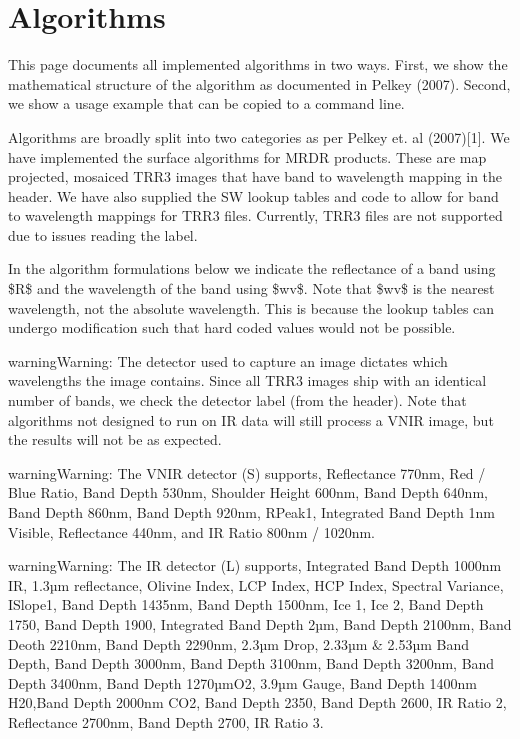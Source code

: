 \documentclass[letterpaper,10pt,english]{sphinxmanual}
\begin{document}
\section{Algorithms}
\label{Algorithms:algorithms}\label{Algorithms::doc}\label{Algorithms:id1}
This page documents all implemented algorithms in two ways.  First, we show the mathematical structure of the algorithm as documented in Pelkey (2007).  Second, we show a usage example that can be copied to a command line.

Algorithms are broadly split into two categories as per Pelkey et. al (2007){[}1{]}.  We have implemented the surface algorithms for MRDR products.  These are map projected, mosaiced TRR3 images that have band to wavelength mapping in the header.  We have also supplied the SW lookup tables and code to allow for band to wavelength mappings for TRR3 files.  Currently, TRR3 files are not supported due to issues reading the label.

In the algorithm formulations below we indicate the reflectance of a band using \$R\$ and the wavelength of the band using \$wv\$.  Note that \$wv\$ is the nearest wavelength, not the absolute wavelength.  This is because the lookup tables can undergo modification such that hard coded values would not be possible.

\begin{notice}{warning}{Warning:}
The detector used to capture an image dictates which wavelengths the image contains.  Since all TRR3 images ship with an identical number of bands, we check the detector label (from the header).  Note that algorithms not designed to run on IR data will still process a VNIR image, but the results will not be as expected.
\end{notice}

\begin{notice}{warning}{Warning:}
The VNIR detector (S) supports, Reflectance 770nm, Red / Blue Ratio, Band Depth 530nm, Shoulder Height 600nm, Band Depth 640nm, Band Depth 860nm, Band Depth 920nm, RPeak1, Integrated Band Depth 1nm Visible, Reflectance 440nm, and IR Ratio 800nm / 1020nm.
\end{notice}

\begin{notice}{warning}{Warning:}
The IR detector (L) supports, Integrated Band Depth 1000nm IR, 1.3µm reflectance, Olivine Index, LCP Index, HCP Index, Spectral Variance, ISlope1, Band Depth 1435nm, Band Depth 1500nm, Ice 1, Ice 2, Band Depth 1750, Band Depth 1900, Integrated Band Depth 2µm, Band Depth 2100nm, Band Deoth 2210nm, Band Depth 2290nm, 2.3µm Drop, 2.33µm \& 2.53µm Band Depth, Band Depth 3000nm, Band Depth 3100nm, Band Depth 3200nm, Band Depth 3400nm, Band Depth 1270µmO2, 3.9µm Gauge, Band Depth 1400nm H20,Band Depth 2000nm CO2, Band Depth 2350, Band Depth 2600, IR Ratio 2, Reflectance 2700nm, Band Depth 2700, IR Ratio 3.
\end{notice}
\end{document}
